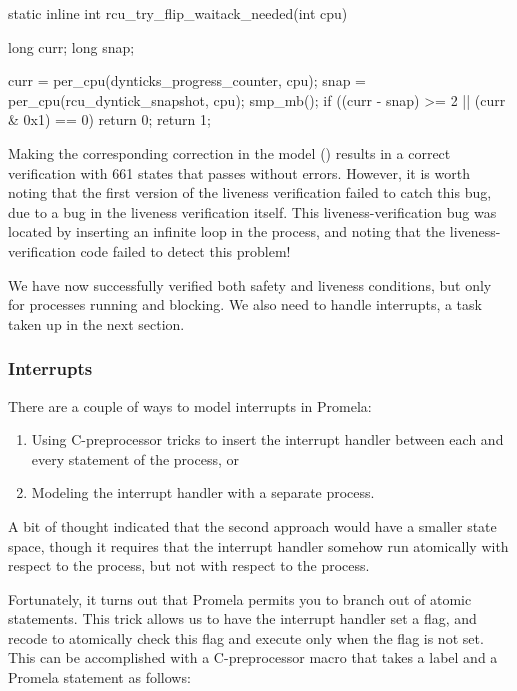 \begin{VerbatimN}[commandchars=\\\[\]]
static inline int
rcu_try_flip_waitack_needed(int cpu)
{
	long curr;
	long snap;

	curr = per_cpu(dynticks_progress_counter, cpu);
	snap = per_cpu(rcu_dyntick_snapshot, cpu);
	smp_mb();
	if ((curr - snap) >= 2 || (curr & 0x1) == 0)
		return 0;
	return 1;
}
\end{VerbatimN}

Making the corresponding correction in the
model ()
results in a correct verification with 661 states that passes without
errors.
However, it is worth noting that the first version of the liveness
verification failed to catch this bug, due to a bug in the liveness
verification itself.
This liveness-verification bug was located by inserting an infinite
loop in the  process, and noting that
the liveness-verification code failed to detect this problem!

We have now successfully verified both safety and liveness
conditions, but only for processes running and blocking.
We also need to handle interrupts, a task taken up in the next section.

\subsubsection{Interrupts}
\label{sec:formal:Interrupts}

There are a couple of ways to model interrupts in Promela:
\begin{enumerate}
\item	Using C-preprocessor tricks to insert the interrupt handler
	between each and every statement of the 
	process, or
\item	Modeling the interrupt handler with a separate process.
\end{enumerate}

A bit of thought indicated that the second approach would have a
smaller state space, though it requires that the interrupt handler
somehow run atomically with respect to the 
process, but not with respect to the 
process.

Fortunately, it turns out that Promela permits you to branch
out of atomic statements.
This trick allows us to have the interrupt handler set a flag, and
recode  to atomically check this flag
and execute only when the flag is not set.
This can be accomplished with a C-preprocessor macro that takes
a label and a Promela statement as follows:

